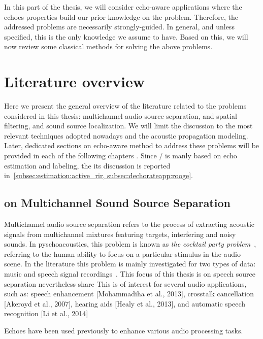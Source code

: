 \mynewline
In this part of the thesis, we will consider echo-aware applications where the echoes properties build our prior knowledge on the problem.
Therefore, the addressed problems are necessarily strongly-guided.
In general, and unless specified, this is the only knowledge we assume to have.
Based on this, we will now review some classical methods for solving the above problems.


\section{Literature overview}\label{sec:application:sota}
Here we present the general overview of the literature related to the problems considered in this thesis: multichannel audio source separation, and spatial filtering, and sound source localization.
We will limit the discussion to the most relevant techniques adopted nowadays and the acoustic propagation modeling.
Later, dedicated sections on echo-aware method to address these problems will be provided in each of the following chapters .
Since \RooGE/ is manly based on echo estimation and labeling, the its discussion is reported in~\cref{subsec:estimation:active_rir, subsec:dechorateapp:rooge}.

\subsection{on Multichannel Sound Source Separation}
Multichannel audio source separation refers to the process of extracting acoustic signals from multichannel mixtures featuring targets, interfering and noisy sounds.
In pyschoacoustics, this problem is known as \textit{the cocktail party problem}~, referring to the human ability to focus on a particular stimulus in the audio scene.
In the literature this problem is mainly investigated for two types of data: music and speech signal recordings~\citeonly{[Vincent et al., 2012]}.
This focus of this thesis is on speech source separation nevertheless share
This is of interest for several audio applications, such as: speech enhancement [Mohammadiha et al., 2013], crosstalk cancellation [Akeroyd et al., 2007], hearing aids [Healy et al., 2013], and automatic speech recognition [Li et al., 2014]

Echoes have been used previously to enhance various audio processing tasks.

